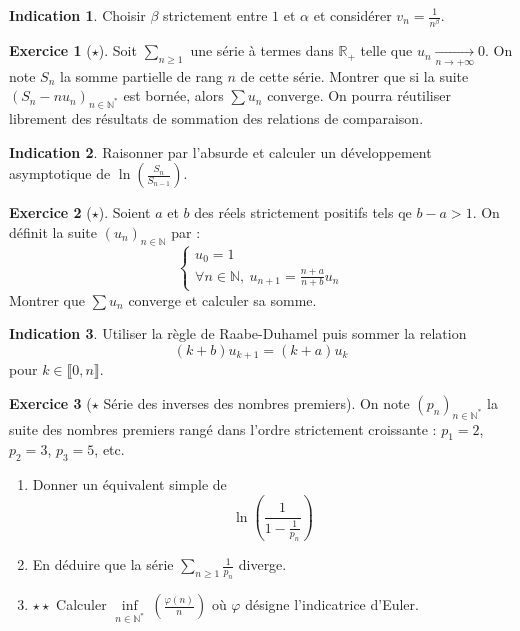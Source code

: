 \documentclass[french]{book}
\newcommand{\N}{\mathbb{N}}
\newcommand{\R}{\mathbb{R}}
\newcommand{\st}{^*}
\theoremstyle{definition}
\newtheorem{ex}{Exercice}[chapter]
\theoremstyle{theorem}
\newtheorem*{ind}{Indication}
\theoremstyle{remark}
\begin{document}
\begin{ind}
	Choisir $\beta$ strictement entre $1$ et $\alpha$ et considérer $v_n=\displaystyle\frac{1}{n^\beta}$.
\end{ind}

\begin{ex}[$\star$]
	Soit $\displaystyle\sum_{n\geqslant 1}$ une série à termes dans $\R_+$ telle que $u_n\xrightarrow[n\to+\infty]{}0$. On note $S_n$ la somme partielle de rang $n$ de cette série. Montrer que si la suite $(S_n-nu_n)_{n\in\N\st}$ est bornée, alors $\displaystyle\sum u_n$ converge. On pourra réutiliser librement des résultats de sommation des relations de comparaison.
\end{ex}

\begin{ind}
	Raisonner par l'absurde et calculer un développement asymptotique de $\ln\displaystyle\left(\frac{S_n}{S_{n-1}}\right)$.
\end{ind}

\begin{ex}[$\star$]
	Soient $a$ et $b$ des réels strictement positifs tels qe $b-a>1$. On définit la suite $(u_n)_{n\in\N}$ par : $$\begin{cases}
		u_0=1\\
		\displaystyle\forall n\in\N,\ u_{n+1}=\frac{n+a}{n+b}u_n
	\end{cases}$$
	Montrer que $\displaystyle\sum u_n$ converge et calculer sa somme.
\end{ex}

\begin{ind}
	Utiliser la règle de Raabe-Duhamel puis sommer la relation $$(k+b)u_{k+1}=(k+a)u_k$$ pour $k\in\llbracket0,n\rrbracket$.
\end{ind}

\begin{ex}[$\star$ Série des inverses des nombres premiers]
	On note $(p_n)_{n\in\N\st}$ la suite des nombres premiers rangé dans l'ordre strictement croissante : $p_1=2$, $p_2=3$, $p_3=5$, etc.
	\begin{enumerate}
		\item Donner un équivalent simple de $$\ln\left(\frac{1}{1-\frac{1}{p_n}}\right)$$
		\item En déduire que la série $\displaystyle\sum_{n\geqslant 1}\frac{1}{p_n}$ diverge.
		\item $\star\star$ Calculer $\displaystyle\underset{n\in\N\st}{\inf}\ \left(\frac{\varphi(n)}{n}\right)$ où $\varphi$ désigne l'indicatrice d'Euler.
	\end{enumerate}
\end{ex}
\end{document}
